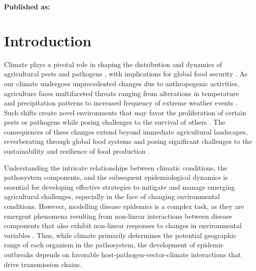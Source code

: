 \vspace{3cm}





\textbf{Published as:}

\vspace{0.5cm}


\newpage
\section{Introduction}

Climate plays a pivotal role in shaping the distribution and dynamics of
agricultural pests and pathogens
\cite{Harvell2002,Lafferty2009,Bebber2013,Bebber2014,Delgado-Baquerizo2020},
with implications for global food security \cite{Fones2020, Ristaino}. As our
climate undergoes unprecedented changes due to anthropogenic activities,
agriculture faces multifaceted threats ranging from alterations in temperature
and precipitation patterns to increased frequency of extreme weather events
\cite{skendzic2021impact}. Such shifts create novel environments that may
favor the proliferation of certain pests or pathogens while posing challenges
to the survival of others \cite{Bebber2013, Dudney2021}. The consequences of
these changes extend beyond immediate agricultural landscapes, reverberating
through global food systems and posing significant challenges to the
sustainability and resilience of food production \cite{Ortiz-Bobea2021}.

Understanding the intricate relationships between climatic conditions, the
pathosystem components, and the subsequent epidemiological dynamics is
essential for developing effective strategies to mitigate and manage emerging
agricultural challenges, especially in the face of changing environmental
conditions. However, modelling disease epidemics is a complex task, as they
are emergent phenomena resulting from non-linear interactions between disease
components that also exhibit non-linear responses to changes in environmental
variables \cite{Scherm1994,garrett2011complexity,Jeger2019}.
Thus, while climate primarily determines the potential geographic range of each
organism in the pathosystem, the development of epidemic outbreaks depends on
favorable host-pathogen-vector-climate interactions that drive transmission
chains.

